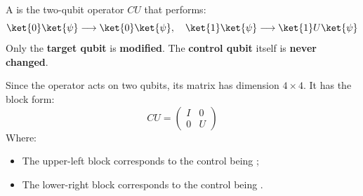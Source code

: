 \begin{definitionbox}
    A  is the two-qubit operator $CU$ that performs:
    \begin{equation*}
        \ket{0} \ket{\psi} \longrightarrow \ket{0} \ket{\psi}, \quad
        \ket{1} \ket{\psi} \longrightarrow \ket{1} U\ket{\psi}
    \end{equation*}
    Only the \textbf{target qubit} is \textbf{modified}. The \textbf{control qubit} itself is \textbf{never changed}.

    \highspace
    Since the operator acts on two qubits, its matrix has dimension $4 \times 4$. It has the block form:
    \begin{equation}\label{eq:controlled-unitary-matrix}
        CU = \begin{pmatrix}
            I & 0 \\
            0 & U
        \end{pmatrix}
    \end{equation}
    Where:
    \begin{itemize}
        \item The upper-left block corresponds to the control being ;
        \item The lower-right block corresponds to the control being .
    \end{itemize}
\end{definitionbox}

